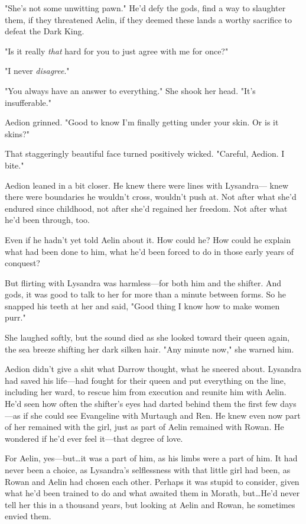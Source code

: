 "She's not some unwitting pawn."
He'd defy the gods, find a way to slaughter them, if they threatened Aelin, if they deemed these lands a worthy sacrifice to defeat the Dark King.

"Is it really \emph{that} hard for you to just agree with me for once?"

"I never \emph{disagree}."

"You always have an answer to everything."
She shook her head.
"It's insufferable."

Aedion grinned.
"Good to know I'm finally getting under your skin.
Or is it skins?"

That staggeringly beautiful face turned positively wicked.
"Careful, Aedion.
I bite."

Aedion leaned in a bit closer.
He knew there were lines with Lysandra--- knew there were boundaries he wouldn't cross, wouldn't push at.
Not after what she'd endured since childhood, not after she'd regained her freedom.
Not after what he'd been through, too.

Even if he hadn't yet told Aelin about it.
How could he?
How could he explain what had been done to him, what he'd been forced to do in those early years of conquest?

But flirting with Lysandra was harmless---for both him and the shifter.
And gods, it was good to talk to her for more than a minute between forms.
So he snapped his teeth at her and said, "Good thing I know how to make women purr."

She laughed softly, but the sound died as she looked toward their queen again, the sea breeze shifting her dark silken hair.
"Any minute now," she warned him.

Aedion didn't give a shit what Darrow thought, what he sneered about.
Lysandra had saved his life---had fought for their queen and put everything on the line, including her ward, to rescue him from execution and reunite him with Aelin.
He'd seen how often the shifter's eyes had darted behind them the first few days---as if she could see Evangeline with Murtaugh and Ren.
He knew even now part of her remained with the girl, just as part of Aelin remained with Rowan.
He wondered if he'd ever feel it---that degree of love.

For Aelin, yes---but\ldots it was a part of him, as his limbs were a part of him.
It had never been a choice, as Lysandra's selflessness with that little girl had been, as Rowan and Aelin had chosen each other.
Perhaps it was stupid to consider, given what he'd been trained to do and what awaited them in Morath, but\ldots He'd never tell her this in a thousand years, but looking at Aelin and Rowan, he sometimes envied them.

